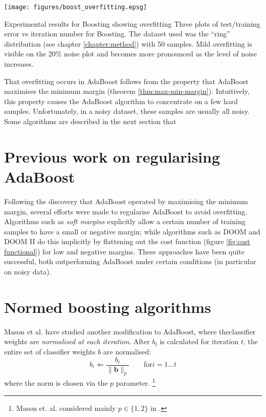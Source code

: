 \begin{linefigure}
\begin{center}
\texttt{[image: figures/boost\_overfitting.epsg]}
\end{center}
\begin{capt}{Experimental results for Boosting showing overfitting}
Three plots of test/training error vs iteration number for Boosting.
The dataset used was the ``ring'' distribution (see chapter
\ref{chapter:method}) with 50 samples.  Mild overfitting is visible on
the 20\% noise plot and becomes more pronounced as the level of noise
increases.
\end{capt}
\end{linefigure}

That overfitting occurs in AdaBoost follows from the property that
AdaBoost maximises the minimum margin (theorem
\ref{thm:max-min-margin}).  Intuitively, this property causes the
AdaBoost algorithm to concentrate on a few hard samples.
Unfortunately, in a noisy dataset, these samples are usually all
noisy.  Some algorithms are described in the next section that 

\section{Previous work on regularising AdaBoost}

Following the discovery that AdaBoost operated by maximising the
minimum margin, several efforts were made to regularise AdaBoost to
avoid overfitting.  Algorithms such as \emph{soft margins}
\cite{Ratsch98} explicitly allow a certain number of training samples
to have a small or negative margin; while algorithms such as DOOM and
DOOM II \cite{Mason99a, Mason99b} do this implicitly by flattening out
the cost function (figure \ref{fig:cost functional}) for low and
negative margins.  These approaches have been quite successful, both
outperforming AdaBoost under certain conditions (in particular on
noisy data).


\section{Normed boosting algorithms}

Mason et al. \cite{Mason99a} have studied another modification to
AdaBoost, where theclassifier weights are \emph{normalised at each
iteration}.  After $b_t$ is calculated for iteration $t$, the entire
set of classifier weights $b$ are normalised:
%
\begin{equation}
b_{i} \Leftarrow \frac{b_i}{\| \mathbf{b} \|_p} \qquad \mbox{for} i=1
\ldots t
\end{equation}
%
where the norm is chosen via the $p$ parameter.%
\footnote{Mason et. al. considered mainly $p \in \{ 1,2 \}$ in
\cite{Mason99a}.}

